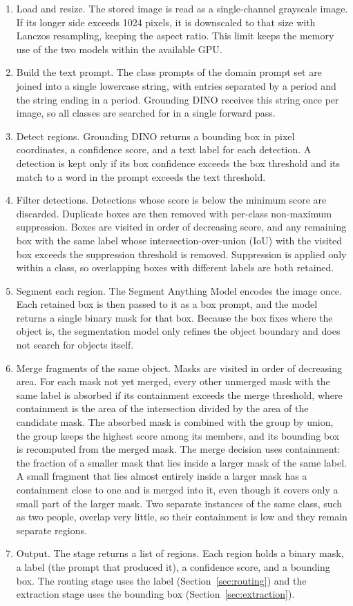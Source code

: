 \documentclass{FastFyp}
\begin{document}
\begin{enumerate}
    \item Load and resize. The stored image is read as a single-channel grayscale image. If its longer side exceeds 1024 pixels, it is downscaled to that size with Lanczos resampling, keeping the aspect ratio. This limit keeps the memory use of the two models within the available GPU.
    \item Build the text prompt. The class prompts of the domain prompt set are joined into a single lowercase string, with entries separated by a period and the string ending in a period. Grounding DINO receives this string once per image, so all classes are searched for in a single forward pass.
    \item Detect regions. Grounding DINO returns a bounding box in pixel coordinates, a confidence score, and a text label for each detection. A detection is kept only if its box confidence exceeds the box threshold and its match to a word in the prompt exceeds the text threshold.
    \item Filter detections. Detections whose score is below the minimum score are discarded. Duplicate boxes are then removed with per-class non-maximum suppression. Boxes are visited in order of decreasing score, and any remaining box with the same label whose intersection-over-union (IoU) with the visited box exceeds the suppression threshold is removed. Suppression is applied only within a class, so overlapping boxes with different labels are both retained.
    \item Segment each region. The Segment Anything Model encodes the image once. Each retained box is then passed to it as a box prompt, and the model returns a single binary mask for that box. Because the box fixes where the object is, the segmentation model only refines the object boundary and does not search for objects itself.
    \item Merge fragments of the same object. Masks are visited in order of decreasing area. For each mask not yet merged, every other unmerged mask with the same label is absorbed if its containment exceeds the merge threshold, where containment is the area of the intersection divided by the area of the candidate mask. The absorbed mask is combined with the group by union, the group keeps the highest score among its members, and its bounding box is recomputed from the merged mask. The merge decision uses containment: the fraction of a smaller mask that lies inside a larger mask of the same label. A small fragment that lies almost entirely inside a larger mask has a containment close to one and is merged into it, even though it covers only a small part of the larger mask. Two separate instances of the same class, such as two people, overlap very little, so their containment is low and they remain separate regions.
    \item Output. The stage returns a list of regions. Each region holds a binary mask, a label (the prompt that produced it), a confidence score, and a bounding box. The routing stage uses the label (Section~\ref{sec:routing}) and the extraction stage uses the bounding box (Section~\ref{sec:extraction}).
\end{enumerate}
\end{document}

